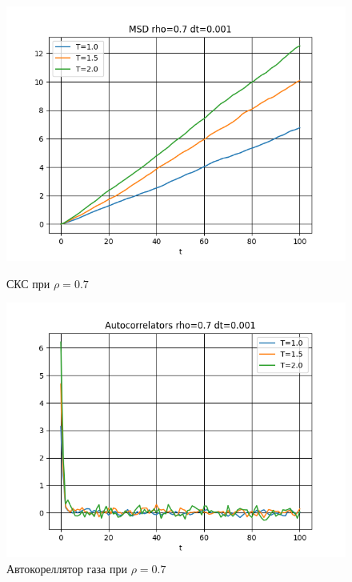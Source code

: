\documentclass[a4paper]{article}
\begin{document}
\begin{figure}[H]
\begin{center}
\begin{minipage}[h]{0.45\linewidth}
\includegraphics[width=1.1\linewidth]{msd.png}
\caption{СКС при $\rho=0.7$} %
\label{ris:experimoriginal} %
\end{minipage}
\hfill
\begin{minipage}[h]{0.45\linewidth}
\begin{center}
\includegraphics[width=1.1\textwidth]{vac.png}
\caption{Автокореллятор газа при $\rho= 0.7$}
\end{center}
\end{minipage}
\end{center}
\end{figure}
\end{document}

